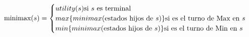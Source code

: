 \documentclass[preview]{standalone}
\begin{document}
\begin{align*}
\text{minimax($s$)} =  \begin{cases}
                                 utility(s) \text{si $s$ es terminal} \cr
                                 max\{minimax(\text{estados hijos de $s$})\} \text{si es el turno de Max en $s$} \cr
                                 min\{minimax(\text{estados hijos de $s$})\} \text{si es el turno de Min en $s$} \cr
                                 \end{cases}
\end{align*}
\end{document}
